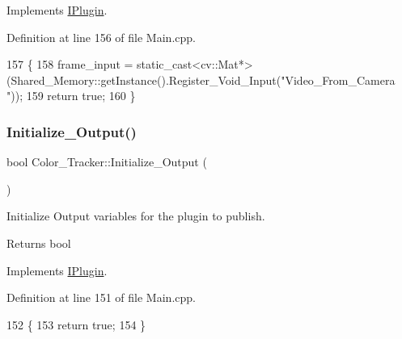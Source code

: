 Implements \hyperlink{class_i_plugin_aa7c66743ad956d8ada57becee559af4d}{I\+Plugin}.



Definition at line 156 of file Main.\+cpp.


\begin{DoxyCode}
157 \{
158     frame\_input = \textcolor{keyword}{static\_cast<}cv::Mat*\textcolor{keyword}{>}(Shared\_Memory::getInstance().Register\_Void\_Input(\textcolor{stringliteral}{"Video\_From\_Camera
      "}));
159     \textcolor{keywordflow}{return} \textcolor{keyword}{true};
160 \}
\end{DoxyCode}
\mbox{\label{class_color___tracker_a289707cab18e4af7f1353ee859da2fb5}} 
\subsubsection{\texorpdfstring{Initialize\+\_\+\+Output()}{Initialize\_Output()}}
{\footnotesize\ttfamily bool Color\+\_\+\+Tracker\+::\+Initialize\+\_\+\+Output (\begin{DoxyParamCaption}{ }\end{DoxyParamCaption})\hspace{0.3cm}{\ttfamily [virtual]}}



Initialize Output variables for the plugin to publish. 

\begin{DoxyReturn}{Returns}
bool 
\end{DoxyReturn}


Implements \hyperlink{class_i_plugin_a0b772513fc8c4ed01240e19c4bb84068}{I\+Plugin}.



Definition at line 151 of file Main.\+cpp.


\begin{DoxyCode}
152 \{
153     \textcolor{keywordflow}{return} \textcolor{keyword}{true};
154 \}
\end{DoxyCode}
\mbox{\label{class_color___tracker_a37bf24d89aac609cb6a773b86d4edcb6}} 
